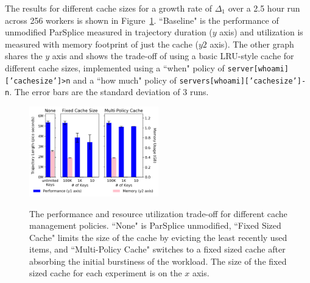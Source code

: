 The results for different cache sizes for a growth rate of \(\Delta_1\) over a
2.5 hour run across 256 workers is shown in
Figure~\ref{fig:methodology-tradeoff}.  ``Baseline" is the performance of
unmodified ParSplice  measured in trajectory duration (\(y\) axis) and
utilization is measured with memory footprint of just the cache (\(y2\) axis).
The other graph shares the \(y\) axis and shows the trade-off of using a basic
LRU-style cache for different cache sizes, implemented using a ``when" policy
of \texttt{server[whoami]['cachesize']>n} and a ``how much" policy of
\texttt{servers[whoami]['cachesize']-n}. The error bars are the standard
deviation of 3 runs. 



\begin{figure}[t]
\noindent\includegraphics[width=0.5\textwidth]{figures/methodology-tradeoff.png}\\
\caption{The performance and resource utilization trade-off for different cache
management policies. ``None" is ParSplice unmodified, ``Fixed Sized Cache"
limits the size of the cache by evicting the least recently used items, and
``Multi-Policy Cache" switches to a fixed sized cache after absorbing the
initial burstiness of the workload.  The size of the fixed sized cache for each
experiment is on the \(x\) axis.  \label{fig:methodology-tradeoff}}
\end{figure}
%
%

